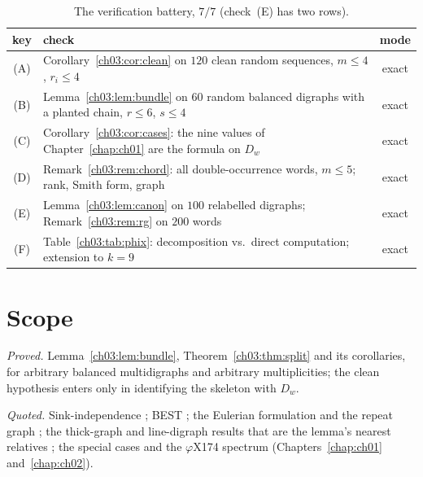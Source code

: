 \begin{table}[ht]
\centering\small
\begin{tabular}{clc}
\toprule
key & check & mode\\
\midrule
(A) & Corollary~\ref{ch03:cor:clean} on $120$ clean random sequences, $m\le4$, $r_i\le4$ & exact\\
(B) & Lemma~\ref{ch03:lem:bundle} on $60$ random balanced digraphs with a planted chain, $r\le6$, $s\le4$ & exact\\
(C) & Corollary~\ref{ch03:cor:cases}: the nine values of Chapter~\ref{chap:ch01} are the formula on $D_w$ & exact\\
(D) & Remark~\ref{ch03:rem:chord}: all double-occurrence words, $m\le5$; rank, Smith form, graph & exact\\
(E) & Lemma~\ref{ch03:lem:canon} on $100$ relabelled digraphs; Remark~\ref{ch03:rem:rg} on $200$ words & exact\\
(F) & Table~\ref{ch03:tab:phix}: decomposition vs.\ direct computation; extension to $k=9$ & exact\\
\bottomrule
\end{tabular}
\caption{The verification battery, $7/7$ (check~(E) has two rows).}
\label{ch03:tab:battery}
\end{table}

\section{Scope}\label{ch03:sec:scope}

\emph{Proved.} Lemma~\ref{ch03:lem:bundle}, Theorem~\ref{ch03:thm:split} and its corollaries, for
arbitrary balanced multidigraphs and arbitrary multiplicities; the clean hypothesis
enters only in identifying the skeleton with $D_w$.

\emph{Quoted.} Sink-independence \cite{HLMPPW}; BEST \cite{BEST,SmithTutte}; the
Eulerian formulation and the repeat graph \cite{PTW,PTT,Flye}; the thick-graph and
line-digraph results that are the lemma's nearest relatives
\cite{ChenSchedler,Alar,Levine,PSX}; the special cases and the $\varphi$X174 spectrum
(Chapters~\ref{chap:ch01} and~\ref{chap:ch02}).

